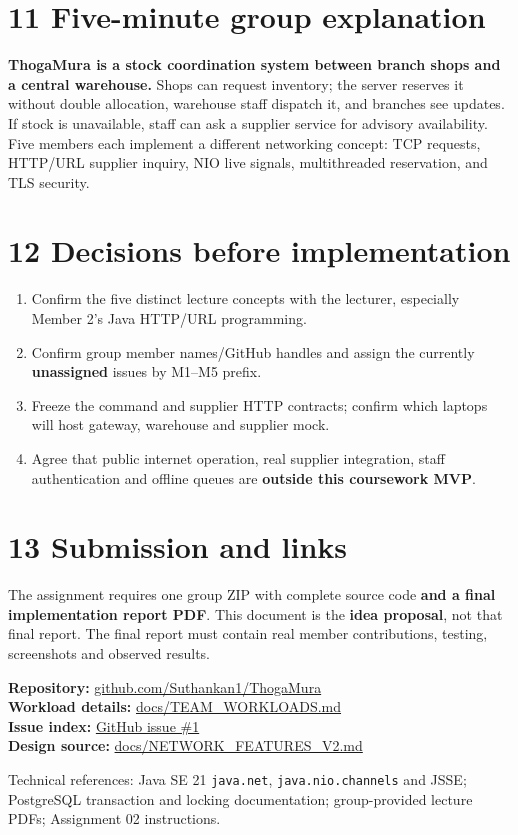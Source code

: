 \documentclass[10pt,a4paper]{article}
\begin{document}
\section*{11 \quad Five-minute group explanation}
\begin{plainbox}
\textbf{ThogaMura is a stock coordination system between branch shops and a central warehouse.} Shops can request inventory; the server reserves it without double allocation, warehouse staff dispatch it, and branches see updates. If stock is unavailable, staff can ask a supplier service for advisory availability. Five members each implement a different networking concept: TCP requests, HTTP/URL supplier inquiry, NIO live signals, multithreaded reservation, and TLS security.
\end{plainbox}

\section*{12 \quad Decisions before implementation}
\begin{enumerate}
\item Confirm the five distinct lecture concepts with the lecturer, especially Member 2's Java HTTP/URL programming.
\item Confirm group member names/GitHub handles and assign the currently \textbf{unassigned} issues by M1--M5 prefix.
\item Freeze the command and supplier HTTP contracts; confirm which laptops will host gateway, warehouse and supplier mock.
\item Agree that public internet operation, real supplier integration, staff authentication and offline queues are \textbf{outside this coursework MVP}.
\end{enumerate}

\section*{13 \quad Submission and links}
The assignment requires one group ZIP with complete source code \textbf{and a final implementation report PDF}. This document is the \textbf{idea proposal}, not that final report. The final report must contain real member contributions, testing, screenshots and observed results.

\textbf{Repository:} \href{https://github.com/Suthankan1/ThogaMura}{github.com/Suthankan1/ThogaMura}\\
\textbf{Workload details:} \href{https://github.com/Suthankan1/ThogaMura/blob/main/docs/TEAM_WORKLOADS.md}{docs/TEAM\_WORKLOADS.md}\\
\textbf{Issue index:} \href{https://github.com/Suthankan1/ThogaMura/issues/1}{GitHub issue \#1}\\
\textbf{Design source:} \href{https://github.com/Suthankan1/ThogaMura/blob/main/docs/NETWORK_FEATURES_V2.md}{docs/NETWORK\_FEATURES\_V2.md}

\vfill
{\footnotesize\color{muted}Technical references: Java SE 21 \texttt{java.net}, \texttt{java.nio.channels} and JSSE; PostgreSQL transaction and locking documentation; group-provided lecture PDFs; Assignment 02 instructions.}\par
\end{document}
